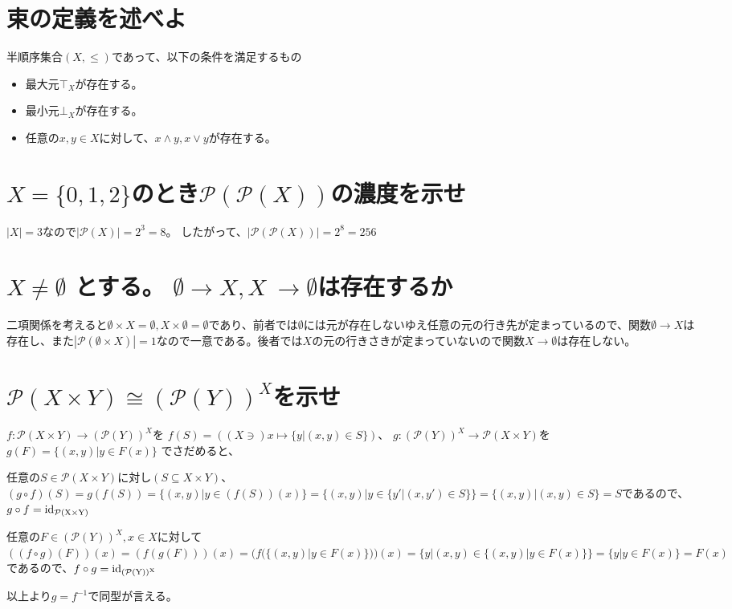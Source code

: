 \documentclass{article}
\begin{document}
\section{束の定義を述べよ}

半順序集合$(X,\leq)$であって、以下の条件を満足するもの
\begin{itemize}
  \item 最大元$\top_X$が存在する。 
  \item 最小元$\bot_X$が存在する。
  \item 任意の$x,y \in X$に対して、$x \wedge y,x \vee y$が存在する。
\end{itemize}

\section{$X=\{0,1,2\}$のとき$\mathcal{P}(\mathcal{P}(X))$の濃度を示せ}

$|X|=3$なので$|\mathcal{P}(X)|=2^3=8$。
したがって、$|\mathcal{P}(\mathcal{P}(X))|=2^8=256$

\section{$X \neq \emptyset$ とする。 $\emptyset \rightarrow X,X \ \rightarrow \emptyset$は存在するか}

二項関係を考えると$\emptyset \times X = \emptyset,X \times \emptyset = \emptyset$であり、前者では$\emptyset$には元が存在しないゆえ任意の元の行き先が定まっているので、関数$\emptyset \rightarrow X$は存在し、また$|\mathcal{P}(\emptyset \times X)|=1$なので一意である。後者では$X$の元の行きさきが定まっていないので関数$X \rightarrow \emptyset$は存在しない。

\section{$\mathcal{P}(X \times Y ) \cong (\mathcal{P}(Y))^X$を示せ}

$f:\mathcal{P}(X \times Y ) \rightarrow (\mathcal{P}(Y))^X$を
$f(S)=((X \ni) x \mapsto \{y|(x,y)\in S \}) $、
$g:(\mathcal{P}(Y))^X \rightarrow \mathcal{P}(X \times Y )$を
$g(F)=\{(x,y)|y \in F(x)\}$
でさだめると、

任意の$S \in \mathcal{P}(X \times Y)$に対し$(S\subseteq X \times Y)$、$(g \circ f)(S)=g(f(S))=\{(x,y)|y \in (f(S))(x)\}=\{(x,y)|y \in \{y'|(x,y')\in S\}\}=\{(x,y)|(x,y)\in S\}=S$であるので、$g \circ f = \rm id_{\mathcal{P}(X \times Y)}$ 

任意の$F \in (\mathcal{P}(Y))^X,x\in X$に対して$((f \circ g)(F))(x)=(f(g(F)))(x)=(f(\{(x,y)|y \in F(x)\}))(x)=\{y|(x,y)\in\{(x,y)|y \in F(x)\}\}=\{y|y\in F(x)\}=F(x)$であるので、$f \circ g = \rm id_{(\mathcal{P}(Y))^X}$

以上より$g=f^{-1}$で同型が言える。
\end{document}
